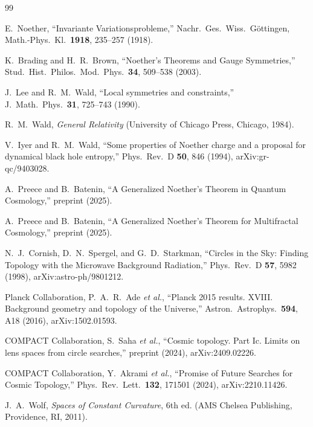 \documentclass[
  reprint,
  amsmath,amssymb,
  aps,
  prd,
  superscriptaddress,
  nofootinbib,
  longbibliography
]{revtex4-2}
\theoremstyle{definition}
\theoremstyle{remark}
\begin{document}
\begin{thebibliography}{99}

E.~Noether,
``Invariante Variationsprobleme,''
Nachr.\ Ges.\ Wiss.\ G{\"o}ttingen, Math.-Phys.\ Kl.\ \textbf{1918}, 235--257 (1918).

K.~Brading and H.~R.~Brown,
``Noether's Theorems and Gauge Symmetries,''
Stud.\ Hist.\ Philos.\ Mod.\ Phys.\ \textbf{34}, 509--538 (2003).

J.~Lee and R.~M.~Wald,
``Local symmetries and constraints,''
J.\ Math.\ Phys.\ \textbf{31}, 725--743 (1990).

R.~M.~Wald,
\emph{General Relativity}
(University of Chicago Press, Chicago, 1984).

V.~Iyer and R.~M.~Wald,
``Some properties of Noether charge and a proposal for dynamical black hole entropy,''
Phys.\ Rev.\ D \textbf{50}, 846 (1994),
arXiv:gr-qc/9403028.

A.~Preece and B.~Batenin,
``A Generalized Noether's Theorem in Quantum Cosmology,''
preprint (2025).

A.~Preece and B.~Batenin,
``A Generalized Noether's Theorem for Multifractal Cosmology,''
preprint (2025).

N.~J.~Cornish, D.~N.~Spergel, and G.~D.~Starkman,
``Circles in the Sky: Finding Topology with the Microwave Background Radiation,''
Phys.\ Rev.\ D \textbf{57}, 5982 (1998),
arXiv:astro-ph/9801212.

Planck Collaboration,
P.~A.~R.~Ade \textit{et al.},
``Planck 2015 results. XVIII. Background geometry and topology of the Universe,''
Astron.\ Astrophys.\ \textbf{594}, A18 (2016),
arXiv:1502.01593.

COMPACT Collaboration,
S.~Saha \textit{et al.},
``Cosmic topology. Part Ic. Limits on lens spaces from circle searches,''
preprint (2024),
arXiv:2409.02226.

COMPACT Collaboration,
Y.~Akrami \textit{et al.},
``Promise of Future Searches for Cosmic Topology,''
Phys.\ Rev.\ Lett.\ \textbf{132}, 171501 (2024),
arXiv:2210.11426.

J.~A.~Wolf,
\emph{Spaces of Constant Curvature},
6th ed. (AMS Chelsea Publishing, Providence, RI, 2011).


\end{thebibliography}
\end{document}

